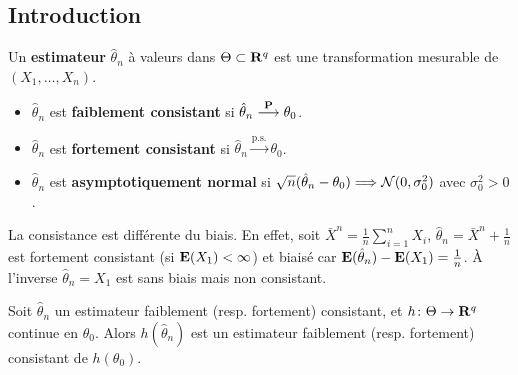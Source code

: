 
\subsection{Introduction}

	\begin{defn}
		Un \textbf{estimateur} $\hat{\theta}_n$ à valeurs dans $\Theta \subset \mathbf{R}^q$ est une transformation mesurable de $(X_1,\ldots,X_n)$.
		\begin{itemize}
			\item[\textbullet] $\hat{\theta}_n$ est \textbf{faiblement consistant} si $\hat{\theta}_n \overset{\mathbf{P}}{\longrightarrow} \theta_0$.
			\item[\textbullet] $\hat{\theta}_n$ est \textbf{fortement consistant} si $\hat{\theta}_n \overset{\text{p.s.}}{\longrightarrow} \theta_0$.
			\item[\textbullet] $\hat{\theta}_n$ est \textbf{asymptotiquement normal} si $\sqrt{n}(\hat{\theta}_n - \theta_0) \Longrightarrow \mathcal{N}(0,\sigma_0^2)$ avec $\sigma_0^2 > 0$.
		\end{itemize}
	\end{defn}

	\begin{rem}
		La consistance est différente du biais.
		En effet, soit $\bar{X}^n = \frac{1}{n} \sum_{i = 1}^n X_i$, $\hat{\theta}_n = \bar{X}^n + \frac{1}{n}$ est fortement consistant (si $\mathbf{E}(X_1) < \infty$) et biaisé car $\mathbf{E}(\hat{\theta}_n) - \mathbf{E}(X_1) = \frac{1}{n}$.
		À l'inverse $\hat{\theta}_n = X_1$ est sans biais mais non consistant.
	\end{rem}
	
	\begin{pop}
		Soit $\hat{\theta}_n$ un estimateur faiblement (resp. fortement) consistant, et $h \colon \Theta \to \mathbf{R}^q$ continue en $\theta_0$.
		Alors $h(\hat{\theta}_n)$ est un estimateur faiblement (resp. fortement) consistant de $h(\theta_0)$.
	\end{pop}
	
